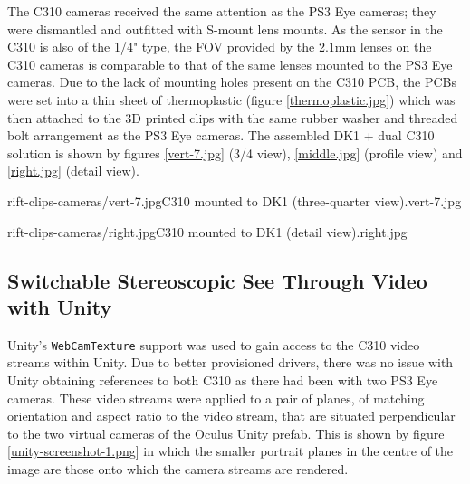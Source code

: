 The C310 cameras received the same attention as the PS3 Eye cameras; they were dismantled and outfitted with S-mount lens mounts. As the sensor in the C310 is also of the 1/4" type, the FOV provided by the 2.1mm lenses on the C310 cameras is comparable to that of the same lenses mounted to the PS3 Eye cameras. Due to the lack of mounting holes present on the C310 PCB, the PCBs were set into a thin sheet of thermoplastic (figure \ref{thermoplastic.jpg}) which was then attached to the 3D printed clips with the same rubber washer and threaded bolt arrangement as the PS3 Eye cameras. The assembled DK1 + dual C310 solution is shown by figures \ref{vert-7.jpg} (3/4 view), \ref{middle.jpg} (profile view) and \ref{right.jpg} (detail view).

       {rift-clips-cameras/vert-7.jpg}{C310 mounted to DK1 (three-quarter view).}{vert-7.jpg}

       {rift-clips-cameras/right.jpg}{C310 mounted to DK1 (detail view).}{right.jpg}


\subsection{Switchable Stereoscopic See Through Video with Unity}

Unity's \texttt{WebCamTexture} support was used to gain access to the C310 video streams within Unity. Due to better provisioned drivers, there was no issue with Unity obtaining references to both C310 as there had been with two PS3 Eye cameras. These video streams were applied to a pair of planes, of matching orientation and aspect ratio to the video stream, that are situated perpendicular to the two virtual cameras of the Oculus Unity prefab. This is shown by figure \ref{unity-screenshot-1.png} in which the smaller portrait planes in the centre of the image are those onto which the camera streams are rendered.

